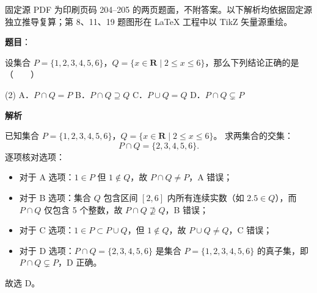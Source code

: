 

\begin{gktip}
固定源 PDF 为印刷页码 204–205 的两页题面，不附答案。以下解析均依据固定源独立推导复算；第 8、11、19 题图形在 LaTeX 工程中以 TikZ 矢量源重绘。
\end{gktip}

\begin{answer}

\textbf{题目}：

设集合 $P = \{1, 2, 3, 4, 5, 6\}$，$Q = \{x \in \mathbf{R} \mid 2 \le x \le 6\}$，那么下列结论正确的是\mbox{（　　）}

\begin{gkopts}(2)
\task A．$P \cap Q = P$
\task B．$P \cap Q \supseteq Q$
\task C．$P \cup Q = Q$
\task D．$P \cap Q \subsetneq P$
\end{gkopts}

\textbf{解析}

已知集合 $P = \{1, 2, 3, 4, 5, 6\}$，$Q = \{x \in \mathbf{R} \mid 2 \le x \le 6\}$。
求两集合的交集：
\nopagebreak[4]
\[
P \cap Q = \{2, 3, 4, 5, 6\}.
\]
逐项核对选项：
\begin{itemize}
\item 对于 A 选项：$1 \in P$ 但 $1 \notin Q$，故 $P \cap Q \neq P$，A 错误；
\item 对于 B 选项：集合 $Q$ 包含区间 $[2, 6]$ 内所有连续实数（如 $2.5 \in Q$），而 $P \cap Q$ 仅包含 5 个整数，故 $P \cap Q \not\supseteq Q$，B 错误；
\item 对于 C 选项：$1 \in P \subset P \cup Q$，但 $1 \notin Q$，故 $P \cup Q \neq Q$，C 错误；
\item 对于 D 选项：$P \cap Q = \{2, 3, 4, 5, 6\}$ 是集合 $P = \{1, 2, 3, 4, 5, 6\}$ 的真子集，即 $P \cap Q \subsetneq P$，D 正确。
\end{itemize}

故选 D。


\end{answer}
